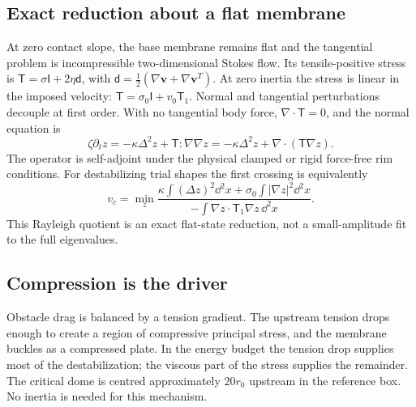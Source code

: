 \subsection{Exact reduction about a flat membrane}
At zero contact slope, the base membrane remains flat and the tangential problem is incompressible two-dimensional Stokes flow. Its tensile-positive stress is $\mathsf T=\sigma\mathsf I+2\eta\mathsf d$, with $\mathsf d=\tfrac12(\nabla\bm v+\nabla\bm v^T)$. At zero inertia the stress is linear in the imposed velocity: $\mathsf T=\sigma_0\mathsf I+v_0\mathsf T_1$. Normal and tangential perturbations decouple at first order. With no tangential body force, $\nabla\cdot\mathsf T=0$, and the normal equation is
\begin{equation}
\zeta\partial_t z=-\kappa\Delta^2 z+\mathsf T:\nabla\nabla z
=-\kappa\Delta^2z+\nabla\cdot(\mathsf T\nabla z).\label{eq:plate}
\end{equation}
The operator is self-adjoint under the physical clamped or rigid force-free rim conditions. For destabilizing trial shapes the first crossing is equivalently
\begin{equation}
v_c=\min_z\frac{\kappa\int(\Delta z)^2\dd^2x+\sigma_0\int|\nabla z|^2\dd^2x}
{-\int\nabla z\cdot\mathsf T_1\nabla z\,\dd^2x}.\label{eq:rayleigh}
\end{equation}
This Rayleigh quotient is an exact flat-state reduction, not a small-amplitude fit to the full eigenvalues.


\subsection{Compression is the driver}
Obstacle drag is balanced by a tension gradient. The upstream tension drops enough to create a region of compressive principal stress, and the membrane buckles as a compressed plate. In the energy budget the tension drop supplies most of the destabilization; the viscous part of the stress supplies the remainder. The critical dome is centred approximately $20r_0$ upstream in the reference box. No inertia is needed for this mechanism.

